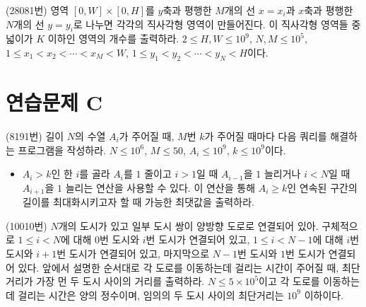 \begin{problem}
    (28081번) 영역 $[0, W] \times [0, H]$를 $y$축과 평행한 $M$개의 선 $x=x_i$과 $x$축과 평행한 $N$개의 선 $y=y_i$로 나누면 각각의 직사각형 영역이 만들어진다. 이 직사각형 영역들 중 넓이가 $K$ 이하인 영역의 개수를 출력하라. $2 \leq H, W \leq 10^9$, $N, M \leq 10^5$, $1 \leq x_1 < x_2 < \cdots < x_M < W$, $1 \leq y_1 < y_2 < \cdots < y_N < H$이다.
\end{problem}

\section{연습문제 C}
\begin{problem}
    (8191번) 길이 $N$의 수열 $A_i$가 주어질 때, $M$번 $k$가 주어질 때마다 다음 쿼리를 해결하는 프로그램을 작성하라. $N \leq 10^6$, $M \leq 50$, $A_i \leq 10^9$, $k \leq 10^9$이다.
    \begin{itemize}
        \item $A_i > k$인 한 $i$를 골라 $A_i$를 $1$ 줄이고 $i > 1$일 때 $A_{i-1}$을 $1$ 늘리거나 $i < N$일 때 $A_{i+1}$을 $1$ 늘리는 연산을 사용할 수 있다. 이 연산을 통해 $A_i \geq k$인 연속된 구간의 길이를 최대화시키고자 할 때 가능한 최댓값을 출력하라.
    \end{itemize}
\end{problem}

\begin{problem}
    (10010번) $N$개의 도시가 있고 일부 도시 쌍이 양방향 도로로 연결되어 있아. 구체적으로 $1 \leq i < N$에 대해 $0$번 도시와 $i$번 도시가 연결되어 있고, $1 \leq i < N-1$에 대해 $i$번 도시와 $i+1$번 도시가 연결되어 있고, 마지막으로 $N-1$번 도시와 $1$번 도시가 연결되어 있다. 앞에서 설명한 순서대로 각 도로를 이동하는데 걸리는 시간이 주어질 때, 최단거리가 가장 먼 두 도시 사이의 거리를 출력하라. $N \leq 5 \times 10^5$이고 각 도로를 이동하는데 걸리는 시간은 양의 정수이며, 임의의 두 도시 사이의 최단거리는 $10^9$ 이하이다.
\end{problem}

